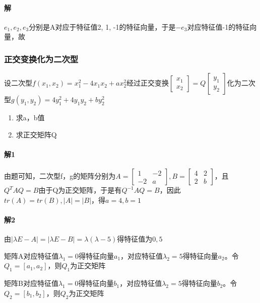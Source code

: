 \paragraph{解}
\(e_1, e_2, e_3\)分别是A对应于特征值2, 1, -1的特征向量，于是\(-e_3\)对应特征值-1的特征向量，故


\subsubsection{正交变换化为二次型}
设二次型\(f(x_1, x_2) = x_1^2 - 4x_1x_2 + ax_2^2\)经过正交变换\(\begin{bmatrix}
    x_1 \\ 
    x_2
\end{bmatrix} = Q\begin{bmatrix}
    y_1 \\ 
    y_2
\end{bmatrix}\)化为二次型\(g(y_1, y_2) = 4y_1^2 + 4y_1y_2 + by_2^2\)
\begin{enumerate}
    \item 求a，b值
    \item 求正交矩阵Q
\end{enumerate}

\paragraph{解1}
由题可知，二次型f，g的矩阵分别为\(A = \begin{bmatrix}
    1 & -2 \\ 
    -2 & a
\end{bmatrix}, B = \begin{bmatrix}
    4 & 2 \\ 
    2 & b
\end{bmatrix}\)，且\(Q^TAQ = B\)由于Q为正交矩阵，于是有\(Q^{-1}AQ = B\)，因此\(tr(A) = tr(B), |A| = |B|\)，得\(a = 4, b = 1\)

\paragraph{解2}
由\(|\lambda E - A| = |\lambda E - B| = \lambda(\lambda - 5)\)得特征值为\(0, 5\)

矩阵A对应特征值\(\lambda_1 = 0\)得特征向量\(a_1\)，对应特征值\(\lambda_2 = 5\)得特征向量\(a_2\)。令\(Q_1 = [a_1, a_2]\)，则\(Q_1\)为正交矩阵

矩阵B对应特征值\(\lambda_1 = 0\)得特征向量\(b_1\)，对应特征值\(\lambda_2 = 5\)得特征向量\(b_2\)。令\(Q_2 = [b_1, b_2]\)，则\(Q_2\)为正交矩阵

